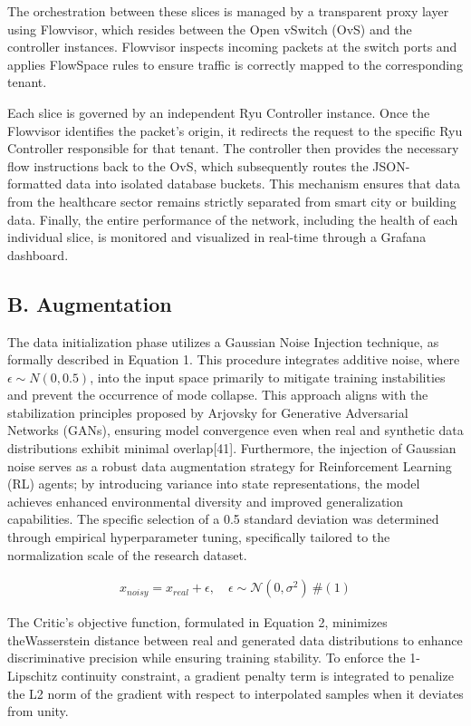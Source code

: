 The orchestration between these slices is managed by a transparent proxy layer using Flowvisor, which resides between the Open vSwitch (OvS) and the controller instances. Flowvisor inspects incoming packets at the switch ports and applies FlowSpace rules to ensure traffic is correctly mapped to the corresponding tenant.

Each slice is governed by an independent Ryu Controller instance. Once the Flowvisor identifies the packet's origin, it redirects the request to the specific Ryu Controller responsible for that tenant. The controller then provides the necessary flow instructions back to the OvS, which subsequently routes the JSON-formatted data into isolated database buckets. This mechanism ensures that data from the healthcare sector remains strictly separated from smart city or building data. Finally, the entire performance of the network, including the health of each individual slice, is monitored and visualized in real-time through a Grafana dashboard.

\subsection{B. Augmentation}\label{b.-augmentation}

The data initialization phase utilizes a Gaussian Noise Injection technique, as formally described in Equation 1. This procedure integrates additive noise, where \(\epsilon \sim N(0,0.5)\), into the input space primarily to mitigate training instabilities and prevent the occurrence of mode collapse. This approach aligns with the stabilization principles proposed by Arjovsky for Generative Adversarial Networks (GANs), ensuring model convergence even when real and synthetic data distributions exhibit minimal overlap{[}41{]}. Furthermore, the injection of Gaussian noise serves as a robust data augmentation strategy for Reinforcement Learning (RL) agents; by introducing variance into state representations, the model achieves enhanced environmental diversity and improved generalization capabilities. The specific selection of a 0.5 standard deviation was determined through empirical hyperparameter tuning, specifically tailored to the normalization scale of the research dataset.

\[\begin{array}{r}
x_{noisy} = x_{real} + \epsilon,\quad\epsilon \sim \mathcal{N}\left( 0,\sigma^{2} \right)\ \#(1)
\end{array}\]

The Critic's objective function, formulated in Equation 2, minimizes theWasserstein distance between real and generated data distributions to enhance discriminative precision while ensuring training stability. To enforce the 1-Lipschitz continuity constraint, a gradient penalty term is integrated to penalize the L2 norm of the gradient with respect to interpolated samples when it deviates from unity.

